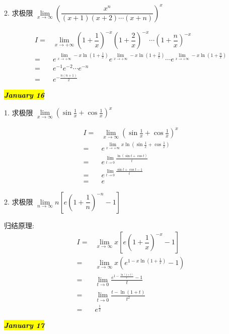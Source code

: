 2. 求极限 $\lim\limits_{x\to \infty}\left(\dfrac{x^{n}}{(x+1)(x+2)\cdots(x+n)} \right)^{x} $
\begin{solution}

	\begin{align*}
		I = & \lim\limits_{x\to +\infty}\left(1+\dfrac{1}{x}\right)^{-x}\left(1+\dfrac{2}{x}\right)^{-x}\cdots \left(1+\dfrac{n}{x}\right)^{-x}\\
		  = & e^{\lim\limits_{x\to +\infty}-x\ln(1+\frac{1}{x})}e^{\lim\limits_{x\to +\infty}-x\ln(1+\frac{2}{x})}\cdots e^{\lim\limits_{x\to +\infty}-x\ln(1+\frac{n}{x})}\\
		  = & e^{-1}e^{-2}\cdots e^{-n}\\
		  = & e^{-\frac{n(n+1)}{2}}
	\end{align*}
\end{solution}
\hl{\textbf{\textit{January 16}}}

1. 求极限 $\lim\limits_{x\to \infty}\left(\sin\frac{1}{x}+\cos\frac{1}{x} \right)^{x} $
\begin{solution}

	\begin{align*}
		I = & \lim\limits_{x\to \infty}\left(\sin\frac{1}{x}+\cos\frac{1}{x} \right)^{x}\\
		  = & e^{\lim\limits_{x\to +\infty}x\ln(\sin\frac{1}{x}+\cos\frac{1}{x})}\\
		  = & e^{\lim\limits_{t\to 0}\frac{\ln(\sin t+\cos t)}{t}}\\
		  = & e^{\lim\limits_{t\to 0}\frac{\sin t+\cos t-1}{t}}\\
		  = & e
	\end{align*}
\end{solution}

2. 求极限 $\lim\limits_{n\to \infty}n\left[e\left(1+\dfrac{1}{n} \right)^{-n}-1 \right]$
\begin{solution}
	
	归结原理:
	\begin{align*}
		I = & \lim\limits_{x\to \infty}x\left[e\left(1+\dfrac{1}{x} \right)^{-x}-1 \right]\\
		  = & \lim\limits_{x\to \infty}x(e^{1-x\ln(1+\frac{1}{x})}-1)\\
		  = & \lim\limits_{t\to 0}\frac{e^{1-\frac{\ln(1+t)}{t}}-1}{t}\\
		  = & \lim\limits_{t\to 0}\frac{t-\ln(1+t)}{t^{2}}\\
		  = & e^{\frac{1}{2}}
	\end{align*}
\end{solution}
\hl{\textbf{\textit{January 17}}}


